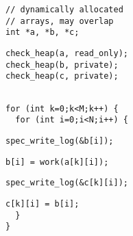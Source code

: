 \begin{lstlisting}[morekeywords={g_qCount},belowskip=0pt, firstnumber=1, name=ver2b]
// dynamically allocated
// arrays, may overlap
int *a, *b, *c;
\end{lstlisting}

\begin{lstlisting}[aboveskip=0pt,belowskip=0pt,backgroundcolor=\color{lightgray},
firstnumber=auto, name=ver2b]
check_heap(a, read_only);
check_heap(b, private);
check_heap(c, private);
\end{lstlisting}

\begin{lstlisting}[aboveskip=0pt,belowskip=0pt, firstnumber=auto, name=ver2b]

for (int k=0;k<M;k++) {
  for (int i=0;i<N;i++) {
\end{lstlisting}

\begin{lstlisting}[aboveskip=0pt,belowskip=0pt,backgroundcolor=\color{lightgray},
firstnumber=auto, name=ver2b]
    spec_write_log(&b[i]);
\end{lstlisting}

\begin{lstlisting}[aboveskip=0pt,belowskip=0pt, firstnumber=auto, name=ver2b]
    b[i] = work(a[k][i]); 
\end{lstlisting}

\begin{lstlisting}[aboveskip=0pt,belowskip=0pt,backgroundcolor=\color{lightgray},
firstnumber=auto, name=ver2b]
    spec_write_log(&c[k][i]);
\end{lstlisting}

\begin{lstlisting}[aboveskip=0pt,belowskip=0pt, firstnumber=auto, name=ver2b]
    c[k][i] = b[i];    
  }
}
\end{lstlisting}
